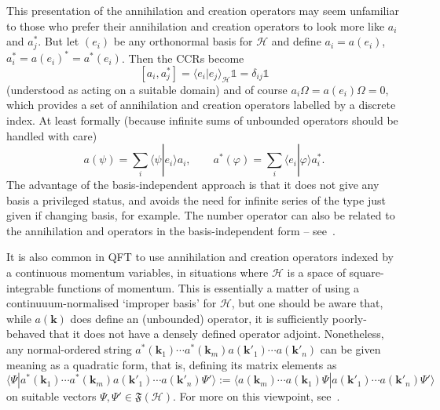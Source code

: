 \documentclass[12pt,a4paper]{article}
\newcommand{\1}{\mathds{1}}                         %
\newcommand{\FF}{{\mathfrak{F}}}
\newcommand{\HH}{{\mathcal{H}}}
\newcommand{\II}{{\mathbb{1}}}
\newcommand{\kb}{{\boldsymbol{k}}}
\newcommand{\ip}[2]{\langle #1|#2\rangle}
\begin{document}
This presentation of the annihilation and creation operators may seem unfamiliar to those who prefer their annihilation and creation operators to look more like $a_i$ and $a_j^*$. But let $(e_i)$ be any orthonormal basis for $\HH$ and define $a_i = a(e_i)$, $a_i^*=a(e_i)^*=a^*(e_i)$. Then the CCRs become
\[
[a_i,a_j^*] = \ip{e_i}{e_j}_\HH \II = \delta_{ij}\II
\]
(understood as acting on a suitable domain) and of course $a_i\Omega=a(e_i)\Omega=0$,
which provides a set of annihilation and creation operators labelled by a discrete index. At least formally (because infinite sums of unbounded operators should be handled with care)
\[
a(\psi) = \sum_i \ip{\psi}{e_i}a_i,\qquad 
a^*(\varphi) = \sum_i \ip{e_i}{\varphi}a_i^*.
\]
The advantage of the basis-independent approach is that it does not give any basis a privileged status, and avoids the need for infinite series of the type just given if changing basis, for example. The number operator can also be related to the annihilation and operators in the basis-independent form -- see~\cite[\S 5.2.3]{BratRob:vol2}.

It is also common in QFT to use annihilation and creation operators indexed by a continuous momentum variables, in situations where $\HH$ is a space of square-integrable functions of momentum. This is essentially a matter of using a continuuum-normalised `improper basis' for $\HH$, but one should be aware that, while
$a(\kb)$ does define an (unbounded) operator, it is sufficiently poorly-behaved that it does not have a densely defined operator adjoint. Nonetheless, any normal-ordered string 
$a^*(\kb_1)\cdots a^*(\kb_m)a(\kb'_{1})\cdots a(\kb'_n)$ can be given
meaning as a quadratic form, that is, defining its matrix elements as
\[
\ip{\Psi}{a^*(\kb_1)\cdots a^*(\kb_m)a(\kb'_{1})\cdots a(\kb'_n)\Psi'}:=
\ip{a(\kb_m)\cdots a(\kb_1)\Psi}{a(\kb'_{1})\cdots a(\kb'_n)\Psi'}
\]  
on suitable vectors $\Psi,\Psi'\in\FF(\HH)$. For more on this viewpoint, see~\cite[\S X.7]{ReedSimon:vol2}.
\end{document}
